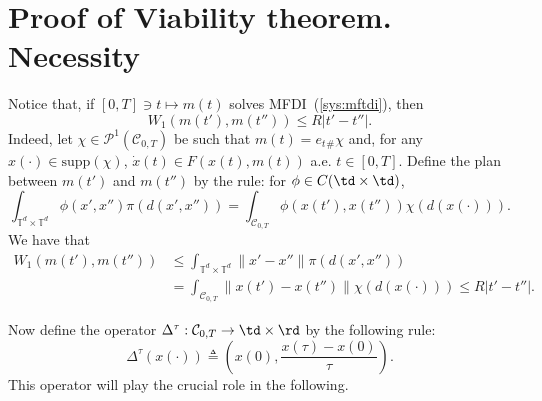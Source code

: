 \documentclass[12pt]{article}
\newcommand{\ac}[2]{\mathcal{C}_{{#1},{#2}}}
\newcommand{\inttdtd}{\int_{\mathbb{T}^d\times \mathbb{T}^d}}
\newcommand{\pc}[2]{\mathcal{P}^1(\mathcal{C}_{{#1},{#2}})}
\begin{document}
\section{Proof of Viability theorem. Necessity}\label{sect:necissity}
Notice that, if $[0,T]\ni t\mapsto m(t)$ solves MFDI~(\ref{sys:mftdi}), then 
\begin{equation}\label{ineq:lip_m}
W_1(m(t'),m(t''))\leq R|t'-t''|.
\end{equation} Indeed, let $\chi\in\pc{0}{T}$ be such that $m(t)=e_t{}_\#\chi$ and, for any $x(\cdot)\in\mathrm{supp}(\chi)$, $\dot{x}(t)\in F(x(t),m(t))$ a.e. $t\in [0,T]$. Define the plan between $m(t')$ and $m(t'')$ by the rule: for $\phi\in C(\td\times\td)$, 
$$\inttdtd\phi(x',x'')\pi(d(x',x''))=\int_{\ac{0}{T}}\phi(x(t'),x(t''))\chi(d(x(\cdot))). $$ We have that
\begin{equation*}\begin{split}W_1(m(t'),m(t''))&\leq \inttdtd\|x'-x''\|\pi(d(x',x''))\\&=\int_{\ac{0}{T}}\|x(t')-x(t'')\|\chi(d(x(\cdot)))\leq R|t'-t''|.\end{split}\end{equation*}

Now define the operator $\Delta^\tau:\mathcal{C}_{0,T}\rightarrow\td\times\rd$ by the following rule:
\begin{equation}\label{def:Delta}
\Delta^\tau(x(\cdot))\triangleq \left(x(0),\frac{x(\tau)-x(0)}{\tau}\right) .
\end{equation} This operator will play the crucial role in the following.
\end{document}

